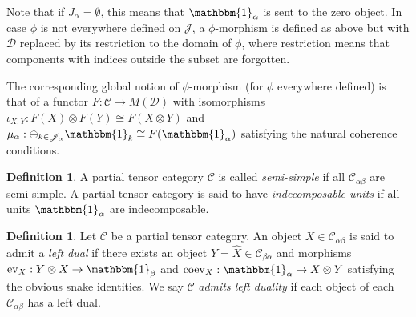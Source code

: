 \documentclass[10pt]{article}
\newcommand{\CatC}{\mathcal{C}}
\newcommand{\CatD}{\mathcal{D}}
\newcommand{\CatCC}{\mathscr{C}}
\newcommand{\CatDD}{\mathscr{D}}
\newcommand{\ev}{\mathrm{ev}}
\newcommand{\coev}{\mathrm{coev}}
\newcommand{\Unitb}{\mathbbm{1}}
\theoremstyle{definition}
\newtheorem{Def}[Theorem]{Definition}
\numberwithin{equation}{section}
\begin{document}
Note that if $J_{\alpha}=\emptyset$, this means that $\Unitb_{\alpha}$ is sent to the zero object. In case $\phi$ is not everywhere defined on $\mathscr{J}$, a $\phi$-morphism is defined as above but with $\CatDD$ replaced by its restriction to the domain of $\phi$, where restriction means that components with indices outside the subset are forgotten.

The corresponding global notion of $\phi$-morphism (for $\phi$ everywhere defined) is that of a functor $F:\CatC \rightarrow M(\CatD)$ with isomorphisms $\iota_{X,Y}:F(X)\otimes F(Y)\cong F(X\otimes Y)$ and $\mu_\alpha:\oplus_{k\in \mathscr{J}_\alpha} \Unitb_k \cong F(\Unitb_\alpha)$ satisfying the natural coherence conditions. 




\begin{Def} A partial tensor category $\CatCC$ is called \emph{semi-simple} if all $\CatC_{\alpha\beta}$ are semi-simple. A partial tensor category is said to have \emph{indecomposable units} if all units $\Unitb_\alpha$ are indecomposable. 
\end{Def}

 

\begin{Def} Let $\CatCC$ be a partial tensor category. An object $X\in \CatC_{\alpha\beta}$ is said to admit a \emph{left dual} if there exists an object $Y=\hat{X} \in \CatC_{\beta\alpha}$ and morphisms $\ev_{X}: Y\otimes X \rightarrow \Unitb_\beta$ and $\coev_X: \Unitb_\alpha\rightarrow X\otimes Y$ satisfying the obvious snake identities. We say $\CatCC$ \emph{admits left duality} if each object of each $\CatC_{\alpha\beta}$ has a left dual.
\end{Def}
\end{document}
